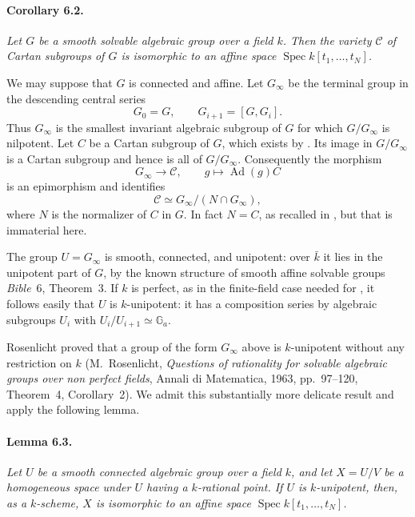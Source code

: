 
\paragraph{\textbf{Corollary 6.2.}}
{\itshape Let \(G\) be a smooth solvable algebraic group over a
field \(k\). Then the variety \(\mathcal C\) of Cartan subgroups
of \(G\) is isomorphic to an affine space
\(\operatorname{Spec}k[t_1,\ldots,t_N]\).}

We may suppose that \(G\) is connected and affine. Let
\(G_\infty\) be the terminal group in the descending central
series
\[
  G_0=G,\qquad G_{i+1}=[G,G_i].
\]
Thus \(G_\infty\) is the smallest invariant algebraic subgroup
of \(G\) for which \(G/G_\infty\) is nilpotent. Let \(C\) be a
Cartan subgroup of \(G\), which exists by . Its image in
\(G/G_\infty\) is a Cartan subgroup and hence is all of
\(G/G_\infty\). Consequently the morphism
\[
  G_\infty\longrightarrow\mathcal C,\qquad
  g\longmapsto\operatorname{Ad}(g)C
\]
is an epimorphism and identifies
\[
  \mathcal C\simeq G_\infty/(N\cap G_\infty),
\]
where \(N\) is the normalizer of \(C\) in \(G\). In fact \(N=C\),
as recalled in , but that is immaterial here.

The group \(U=G_\infty\) is smooth, connected, and unipotent:
over \(\bar k\) it lies in the unipotent part of \(G\), by the
known structure of smooth affine solvable groups
\textup{\emph{Bible}~6, Theorem~3}. If \(k\) is perfect, as in
the finite-field case needed for , it follows easily that
\(U\) is \(k\)-unipotent: it has a composition series by
algebraic subgroups \(U_i\) with
\(U_i/U_{i+1}\simeq\mathbb G_a\).

Rosenlicht proved that a group of the form \(G_\infty\) above is
\(k\)-unipotent without any restriction on \(k\)
\textup{(M.~Rosenlicht, \emph{Questions of rationality for
solvable algebraic groups over non perfect fields}, Annali di
Matematica, 1963, pp.~97--120, Theorem~4, Corollary~2)}. We admit
this substantially more delicate result and apply the following
lemma.

\paragraph{\textbf{Lemma 6.3.}}
{\itshape Let \(U\) be a smooth connected algebraic group over a
field \(k\), and let \(X=U/V\) be a homogeneous space under \(U\)
having a \(k\)-rational point. If \(U\) is \(k\)-unipotent, then,
as a \(k\)-scheme, \(X\) is isomorphic to an affine space
\(\operatorname{Spec}k[t_1,\ldots,t_N]\).}

